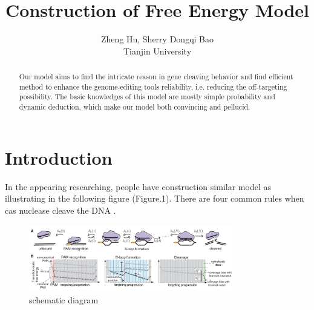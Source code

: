 \documentclass[a4paper,10pt]{article}
\title{Construction of Free Energy Model}
\author{Zheng Hu, Sherry Dongqi Bao \\ Tianjin University}
\begin{document}
	\maketitle

	\begin{abstract}
	Our model aims to find the intricate reason in gene cleaving behavior and find efficient method to enhance the genome-editing tools reliability, i.e. reducing the off-targeting possibility.
	The basic knowledges of this model are mostly simple probability and dynamic deduction, which make our model both convincing and pellucid.
	\end{abstract}
	
	
	\printbibliography
	\section{Introduction}
	In the appearing researching, people have construction similar model as illustrating in the following figure (Figure.1). There are four common rules when cas nuclease cleave the DNA \parencite{KLEIN20181413} 
	.
		\begin{figure}[tbph]
		\centering
		\includegraphics[width=3.5in]{1}
		\caption{schematic diagram}
		\label{fig:1}
		\end{figure}
\end{document}
